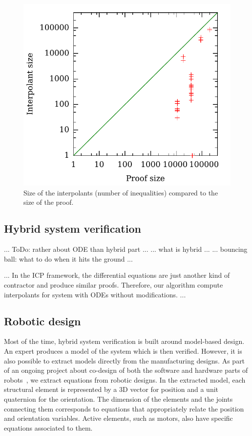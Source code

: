 \begin{figure}
\centering
\includegraphics[scale=0.6]{img/itpsize2.pdf}
\caption{
    Size of the interpolants (number of inequalities) compared to the size of the proof.
}
\label{fig:flyspeck}
\end{figure}


\subsection{Hybrid system verification}

... ToDo: rather about ODE than hybrid part ...
... what is hybrid ...
... bouncing ball: what to do when it hits the ground ...

...
In the ICP framework, the differential equations are just another kind of contractor and produce similar proofs.
Therefore, our algorithm compute interpolants for system with ODEs without modifications.
...


\subsection{Robotic design}

Most of the time, hybrid system verification is built around model-based design.
An expert produces a model of the system which is then verified.
However, it is also possible to extract models directly from the manufacturing designs.
As part of an ongoing project about co-design of both the software and hardware parts of robots~\cite{react}, we extract equations from robotic designs.
In the extracted model, each structural element is represented by a 3D vector for position and a unit quaternion for the orientation.
The dimension of the elements and the joints connecting them corresponds to equations that appropriately relate the position and orientation variables.
Active elements, such as motors, also have specific equations associated to them.


